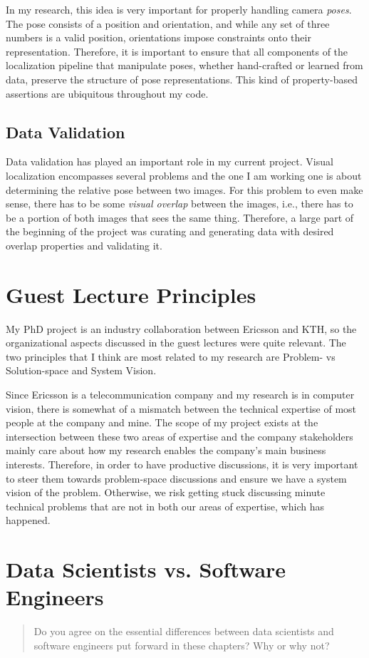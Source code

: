 \documentclass[11pt]{article}
\begin{document}
In my research, this idea is very important for properly handling camera \emph{poses}.
The pose consists of a position and orientation, and while any set of three numbers is a valid position, orientations impose constraints onto their representation.
Therefore, it is important to ensure that all components of the localization pipeline that manipulate poses, whether hand-crafted or learned from data, preserve the structure of pose representations.
This kind of property-based assertions are ubiquitous throughout my code.

\subsection{Data Validation}
Data validation has played an important role in my current project.
Visual localization encompasses several problems and the one I am working one is about determining the relative pose between two images.
For this problem to even make sense, there has to be some \emph{visual overlap} between the images, i.e., there has to be a portion of both images that sees the same thing.
Therefore, a large part of the beginning of the project was curating and generating data with desired overlap properties and validating it.

\section{Guest Lecture Principles}

My PhD project is an industry collaboration between Ericsson and KTH, so the organizational aspects discussed in the guest lectures were quite relevant.
The two principles that I think are most related to my research are Problem- vs Solution-space and System Vision.

Since Ericsson is a telecommunication company and my research is in computer vision, there is somewhat of a mismatch between the technical expertise of most people at the company and mine.
The scope of my project exists at the intersection between these two areas of expertise and the company stakeholders mainly care about how my research enables the company's main business interests.
Therefore, in order to have productive discussions, it is very important to steer them towards problem-space discussions and ensure we have a system vision of the problem.
Otherwise, we risk getting stuck discussing minute technical problems that are not in both our areas of expertise, which has happened.

\section{Data Scientists vs. Software Engineers}
\begin{quote}
Do you agree on the essential differences between data scientists and software engineers put forward in these chapters? Why or why not?
\end{quote}
\end{document}
